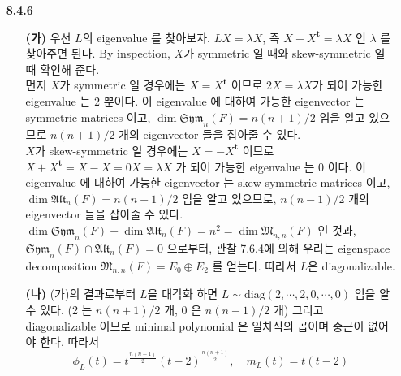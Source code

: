 \documentclass[12pt]{report}
\newcommand*{\trans}{^{\mathrm{\mathbf{t}}}}%
\newcommand*{\matrixM}{\mathfrak{M}}%
\begin{document}
\begin{itemize}
\item[\textbf{8.4.6}] 
	\begin{itemize}
		\item[\textbf{(가)}] 우선 $L$의 eigenvalue 를 찾아보자. $LX=\lambda X$, 즉 $X+X\trans = \lambda X$ 인 $\lambda$ 를 찾아주면 된다. By inspection, $X$가 symmetric 일 때와 skew-symmetric 일 때 확인해 준다. \\ 먼저 $X$가 symmetric 일 경우에는 $X=X\trans$ 이므로 $2X=\lambda X$가 되어 가능한 eigenvalue 는 $2$ 뿐이다. 이 eigenvalue 에 대하여 가능한 eigenvector 는 symmetric matrices 이고, $\dim \mathfrak{Sym}_n(F)= n(n+1)/2$ 임을 알고 있으므로 $n(n+1)/2$ 개의 eigenvector 들을 잡아줄 수 있다. \\ $X$가 skew-symmetric 일 경우에는 $X=-X\trans$ 이므로 $X+X\trans = X - X = 0X = \lambda X$ 가 되어 가능한 eigenvalue 는 $0$ 이다. 이 eigenvalue 에 대하여 가능한 eigenvector 는 skew-symmetric matrices 이고, $\dim \mathfrak{Alt}_n(F)=n(n-1)/2$ 임을 알고 있으므로, $n(n-1)/2$ 개의 eigenvector 들을 잡아줄 수 있다.\\
		$\dim \mathfrak{Sym}_n(F) + \dim \mathfrak{Alt}_n(F) = n^2 = \dim \matrixM_{n, n}(F)$ 인 것과, $\mathfrak{Sym}_n(F) \cap \mathfrak{Alt}_n(F) = 0$ 으로부터, 관찰 7.6.4에 의해 우리는 eigenspace decomposition $\matrixM_{n, n}(F) = E_0  \oplus E_2$ 를 얻는다. 따라서 $L$은 diagonalizable.
		\item[\textbf{(나)}] (가)의 결과로부터 $L$을 대각화 하면 $L \sim \text{diag}(2, \cdots, 2, 0, \cdots, 0)$ 임을 알 수 있다. (2 는 $n(n+1)/2$ 개, 0 은 $n(n-1)/2$ 개) 그리고 diagonalizable 이므로 minimal polynomial 은 일차식의 곱이며 중근이 없어야 한다. 따라서 $$\phi_L(t) = t^{\frac{n(n-1)}{2}}(t-2)^{\frac{n(n+1)}{2}}, \quad m_L(t) = t(t-2)$$
	\end{itemize}
	

\end{itemize}
\end{document}
